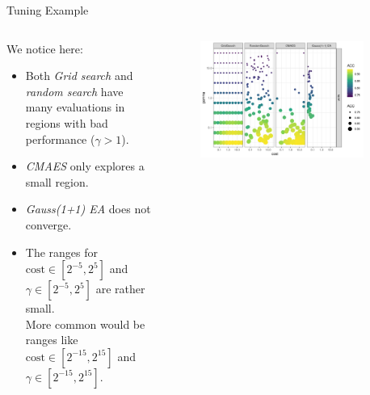 \begin{frame}{Tuning Example}

\begin{columns}
\begin{column}{0.45\textwidth}
  \vspace{1em}

  We notice here:

  \begin{itemize}
      \item Both \emph{Grid search} and \emph{random search} have many evaluations in regions with bad performance ($\gamma>1$).
      \item \emph{CMAES} only explores a small region.
      \item \emph{Gauss(1+1) EA} does not converge.
      \item The ranges for $\text{cost} \in [2^{-5}, 2^5]$ and $\gamma \in [2^{-5}, 2^5]$ are rather small. \\
      More common would be ranges like $\text{cost} \in [2^{-15}, 2^{15}]$ and $\gamma \in [2^{-15}, 2^{15}]$.
  \end{itemize}
\end{column}%
\begin{column}{0.5\textwidth}
  \vspace{-1em}
  \begin{figure}
  \includegraphics[width=0.9\textwidth]{images/benchmark_scatter.png}
  \end{figure}
\end{column}
\end{columns}

\end{frame}
